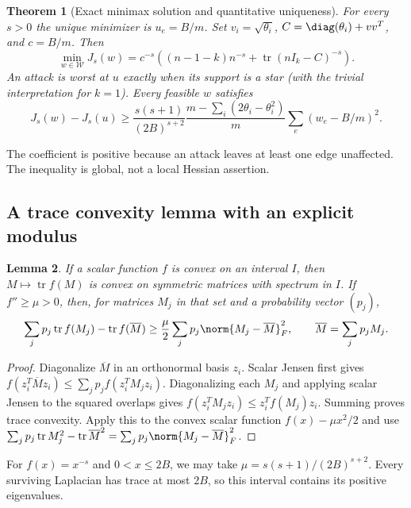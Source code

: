 \documentclass[11pt,a4paper]{article}
\newtheorem{theorem}{Theorem}[section]
\newtheorem{lemma}[theorem]{Lemma}
\theoremstyle{definition}\newtheorem{definition}[theorem]{Definition}
\theoremstyle{remark}\newtheorem{remark}[theorem]{Remark}
\DeclareMathOperator{\tr}{tr}\DeclareMathOperator{\supp}{supp}\DeclareMathOperator{\TV}{TV}
\numberwithin{equation}{section}
\begin{document}
\begin{theorem}[Exact minimax solution and quantitative uniqueness]\label{T02-thm:main}
For every $s>0$ the unique minimizer is $u_e=B/m$. Set $v_i=\sqrt{\theta_i}$, $C=\diag(\theta_i)+vv^T$, and $c=B/m$. Then
\begin{equation}\label{T02-eq:value}
 \min_{w\in\mathcal W}J_s(w)=c^{-s}\left((n-1-k)n^{-s}+\tr(nI_k-C)^{-s}\right).
\end{equation}
An attack is worst at $u$ exactly when its support is a star (with the trivial interpretation for $k=1$). Every feasible $w$ satisfies
\begin{equation}\label{T02-eq:stability}
 J_s(w)-J_s(u)\ge
 \frac{s(s+1)}{(2B)^{s+2}}
 \frac{m-\sum_i(2\theta_i-\theta_i^2)}{m}
 \sum_e(w_e-B/m)^2.
\end{equation}
\end{theorem}
The coefficient is positive because an attack leaves at least one edge unaffected. The inequality is global, not a local Hessian assertion.

\subsection{A trace convexity lemma with an explicit modulus}\label{T02-sec-2}
\begin{lemma}\label{T02-lem:convex}
If a scalar function $f$ is convex on an interval $I$, then $M\mapsto\tr f(M)$ is convex on symmetric matrices with spectrum in $I$. If $f''\ge\mu>0$, then, for matrices $M_j$ in that set and a probability vector $(p_j)$,
\[
 \sum_jp_j\tr f(M_j)-\tr f(\overline M)
 \ge\frac\mu2\sum_jp_j\norm{M_j-\overline M}_F^2,
 \qquad \overline M=\sum_jp_jM_j.
\]
\end{lemma}
\begin{proof}
Diagonalize $\overline M$ in an orthonormal basis $z_i$. Scalar Jensen first gives
$f(z_i^T\overline Mz_i)\le\sum_jp_j f(z_i^TM_jz_i)$. Diagonalizing each $M_j$ and applying scalar Jensen to the squared overlaps gives $f(z_i^TM_jz_i)\le z_i^Tf(M_j)z_i$. Summing proves trace convexity. Apply this to the convex scalar function $f(x)-\mu x^2/2$ and use
$\sum_jp_j\tr M_j^2-\tr\overline M^2=\sum_jp_j\norm{M_j-\overline M}_F^2$.
\end{proof}
For $f(x)=x^{-s}$ and $0<x\le2B$, we may take $\mu=s(s+1)/(2B)^{s+2}$. Every surviving Laplacian has trace at most $2B$, so this interval contains its positive eigenvalues.
\end{document}
